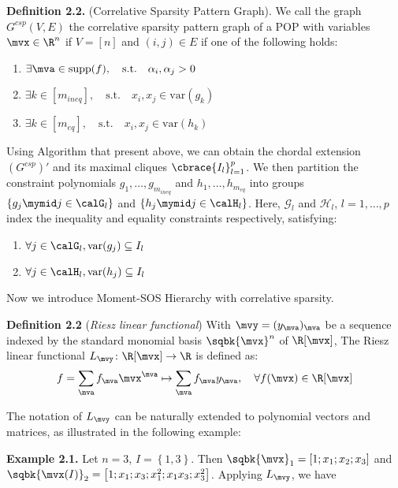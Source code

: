 \textbf{Definition 2.2.} (Correlative Sparsity Pattern Graph). We call the graph $G^{csp}(V, E)$ the correlative sparsity pattern graph of a POP with variables $\mvx \in \R^n$ if $V = [n]$ and $(i, j) \in E$ if one of the following holds:
\begin{enumerate}
    \item $\exists \mva \in \text{supp}(f), \quad\text{s.t.}\quad \alpha_i, \alpha_j > 0$
    \item $\exists k \in [m_{ineq}], \quad\text{s.t.}\quad x_i, x_j \in \text{var}(g_k)$
    \item $\exists k \in [m_{eq}], \quad\text{s.t.}\quad x_i, x_j \in \text{var}(h_k)$
\end{enumerate}

Using Algorithm that present above, we can obtain the chordal extension $(G^{csp})'$ and its maximal cliques $\cbrace{I_l}_{l=1}^{p}$. We then partition the constraint polynomials $g_1, \dots, g_{m_{ineq}}$ and $h_1, \dots, h_{m_{eq}}$ into groups $\left\{ g_j\mymid j\in \calG_l \right\}$ and $\left\{ h_j\mymid j\in \calH_l \right\}$. Here, $\mathcal{G}_l$ and $\mathcal{H}_l$, $l=1,\dots,p$ index the inequality and equality constraints respectively, satisfying:
\begin{enumerate}
    \item $\forall j \in \calG_l, \text{var}(g_j)\subseteq I_l$ 
    \item $\forall j \in \calH_l, \text{var}(h_j)\subseteq I_l$
\end{enumerate}

Now we introduce Moment-SOS Hierarchy with correlative sparsity. 

\textbf{Definition 2.2} (\emph{Riesz linear functional})
With $\mvy = (y_\mva)_{\mva}$ be a sequence indexed by the standard monomial basis $\sqbk{\mvx}^n$ of $\R[\mvx]$, The Riesz linear functional $L_{\mvy} \colon \R[\mvx]\to \R$ is defined as:
\begin{equation*}
    f = \sum_{\mva}f_{\mva}\mvx^\mva \mapsto \sum_{\mva}f_{\mva}y_{\mva}, \quad \forall f(\mvx) \in \R[\mvx]
\end{equation*}

The notation of $L_{\mvy}$ can be naturally extended to polynomial vectors and matrices, as illustrated in the following example:

\textbf{Example 2.1.} Let $n = 3$, $I = \left\{ 1,3 \right\}$. Then $\sqbk{\mvx}_1 = \left[1;x_1;x_2;x_3\right]$ and $\sqbk{\mvx(I)}_2 = \left[ 1;x_1;x_3;x_1^2;x_1x_3;x_3^2 \right]$. Applying $L_{\mvy}$, we have

